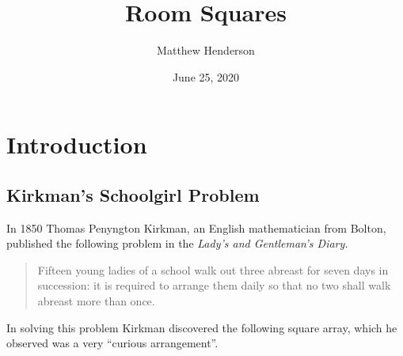 \documentclass[
  12pt,
  a4paper]{book}
\title{Room Squares}
\author{Matthew Henderson}
\date{June 25, 2020}
\begin{document}
\maketitle

{
\setcounter{tocdepth}{1}
\tableofcontents
}
\hypertarget{introduction}{%
\chapter{Introduction}\label{introduction}}

\hypertarget{kirkmans-schoolgirl-problem}{%
\section{Kirkman's Schoolgirl Problem}\label{kirkmans-schoolgirl-problem}}

In 1850 Thomas Penyngton Kirkman, an English mathematician from Bolton,
published the following problem in the \emph{Lady's and Gentleman's Diary.}

\begin{quote}
Fifteen young ladies of a school walk out three abreast for seven
days in succession: it is required to arrange them daily so that no
two shall walk abreast more than once.
\end{quote}

In solving this problem Kirkman discovered the following square array,
which he observed was a very ``curious arrangement''.
\end{document}
